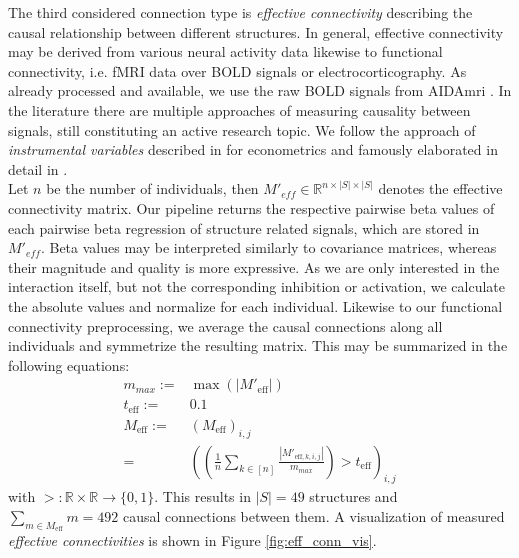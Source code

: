 \documentclass[]{article}
\renewcommand{\cite}{\citep}
\begin{document}
The third considered connection type is \textit{effective connectivity} describing the causal relationship between different structures. In general, effective connectivity may be derived from various neural activity data likewise to functional connectivity, i.e. fMRI data over BOLD signals or electrocorticography. As already processed and available, we use the raw BOLD signals from AIDAmri \cite{AIDAmri2019}. 
In the literature there are multiple approaches of measuring causality between signals, still constituting an active research topic. We follow the approach of \textit{instrumental variables} described in \citet{angrist2009mostly} for econometrics and famously elaborated in detail in \citet{pearl2009causality}.\\

Let $n$ be the number of individuals, then $M'_{eff}\in\mathbb{R}^{n\times|S|\times|S|}$ denotes the effective connectivity matrix. Our pipeline returns the respective pairwise beta values of each pairwise beta regression of structure related signals, which are stored in $M'_{eff}$. Beta values may be interpreted similarly to covariance matrices, whereas their magnitude and quality is more expressive. As we are only interested in the interaction itself, but not the corresponding inhibition or activation, we calculate the absolute values and normalize for each individual. Likewise to our functional connectivity preprocessing, we average the causal connections along all individuals and symmetrize the resulting matrix. This may be summarized in the following equations:
\begin{align*}
	m_{max}:=& \max \left(\left|M'_{\text{eff}}\right|\right)\\
	t_{\text{eff}}:=& 0.1\\
	M_{\text{eff}}:=& \left(M_{\text{eff}}\right)_{i,j} \\
	=& \left(\left(\frac{1}{n}\sum_{k\in [n]}\frac{\left|M'_{\text{eff}, k,i,j}\right|}{m_{max}} \right) > t_{\text{eff}} \right)_{i,j}
\end{align*}
with $>:\mathbb{R}\times\mathbb{R}\rightarrow \{0,1\} $. 
This results in $|S|=49$ structures and $\sum_{m\in M_{\text{eff}} }m=492$ causal connections between them. A visualization of measured \textit{effective connectivities} is shown in Figure \ref{fig:eff_conn_vis}.
\end{document}

